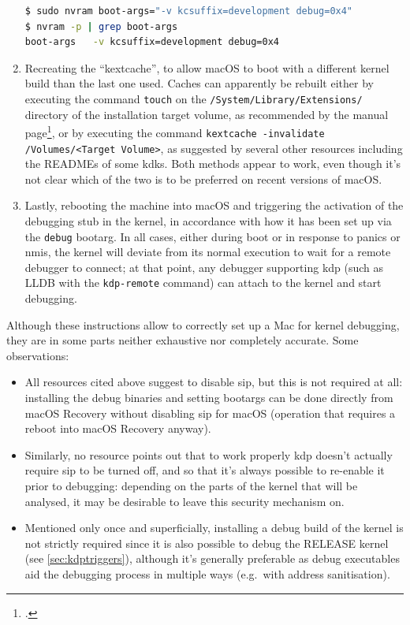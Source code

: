 \begin{enumerate}
\begin{lstlisting}[style=out,language=bash,caption={Example usage of the \protect\path{/usr/sbin/nvram} utility},label={lst:nvram}]
$ sudo nvram boot-args="-v kcsuffix=development debug=0x4"
$ nvram -p | grep boot-args
boot-args	-v kcsuffix=development debug=0x4
\end{lstlisting}

    \item Recreating the \enquote{kextcache}, to allow macOS to boot with a different kernel build than the last one used. Caches can apparently be rebuilt either by executing the command \lstinline{touch} on the \lstinline{/System/Library/Extensions/} directory of the installation target volume, as recommended by the  manual page\footcite{BSDkextcache}, or by executing the command \lstinline{kextcache -invalidate /Volumes/<Target Volume>}, as suggested by several other resources including the READMEs of some \glspl{kdk}. Both methods appear to work, even though it's not clear which of the two is to be preferred on recent versions of macOS.

    \item Lastly, rebooting the machine into macOS and triggering the activation of the debugging stub in the kernel, in accordance with how it has been set up via the \lstinline{debug} \gls{bootarg}. In all cases, either during boot or in response to panics or \glspl{nmi}, the kernel will deviate from its normal execution to wait for a remote debugger to connect; at that point, any debugger supporting \gls{kdp} (such as LLDB with the \lstinline{kdp-remote} command) can attach to the kernel and start debugging.
\end{enumerate}

Although these instructions allow to correctly set up a Mac for kernel debugging, they are in some parts neither exhaustive nor completely accurate. Some observations:
\begin{itemize}
\item All resources cited above suggest to disable \gls{sip}, but this is not required at all: installing the debug binaries and setting \glspl{bootarg} can be done directly from macOS Recovery without disabling \gls{sip} for macOS (operation that requires a reboot into macOS Recovery anyway).

\item Similarly, no resource points out that to work properly \gls{kdp} doesn't actually require \gls{sip} to be turned off, and so that it's always possible to re-enable it prior to debugging: depending on the parts of the kernel that will be analysed, it may be desirable to leave this security mechanism on.

\item Mentioned only once and superficially, installing a debug build of the kernel is not strictly required since it is also possible to debug the RELEASE kernel (see \cref{sec:kdptriggers}), although it's generally preferable as debug executables aid the debugging process in multiple ways (e.g.\ with address sanitisation).
\end{itemize}

